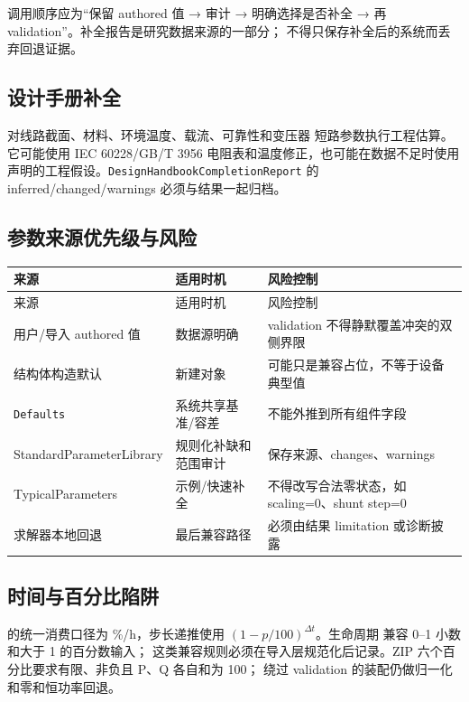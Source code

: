 调用顺序应为“保留 authored 值 → 审计 → 明确选择是否补全 → 再 validation”。补全报告是研究数据来源的一部分；
不得只保存补全后的系统而丢弃回退证据。

\subsection{设计手册补全}

 对线路截面、材料、环境温度、载流、可靠性和变压器
短路参数执行工程估算。它可能使用 IEC 60228/GB/T 3956 电阻表和温度修正，也可能在数据不足时使用
声明的工程假设。\texttt{DesignHandbookCompletionReport} 的 inferred/changed/warnings 必须与结果一起归档。

\subsection{参数来源优先级与风险}

\begin{center}\footnotesize
\begin{longtable}{@{}L{4.0cm}L{5.0cm}L{6.4cm}@{}}
\toprule 来源 & 适用时机 & 风险控制\\\midrule
\endfirsthead
\toprule 来源 & 适用时机 & 风险控制\\\midrule\endhead
用户/导入 authored 值 & 数据源明确 & validation 不得静默覆盖冲突的双侧界限\\
结构体构造默认 & 新建对象 & 可能只是兼容占位，不等于设备典型值\\
\texttt{Defaults} & 系统共享基准/容差 & 不能外推到所有组件字段\\
StandardParameterLibrary & 规则化补缺和范围审计 & 保存来源、changes、warnings\\
TypicalParameters & 示例/快速补全 & 不得改写合法零状态，如 scaling=0、shunt step=0\\
求解器本地回退 & 最后兼容路径 & 必须由结果 limitation 或诊断披露\\
\bottomrule
\end{longtable}
\end{center}

\subsection{时间与百分比陷阱}

 的统一消费口径为 \%/h，步长递推使用
$(1-p/100)^{\Delta t}$。生命周期  兼容 0--1 小数和大于 1 的百分数输入；
这类兼容规则必须在导入层规范化后记录。ZIP 六个百分比要求有限、非负且 P、Q 各自和为 100；
绕过 validation 的装配仍做归一化和零和恒功率回退。


